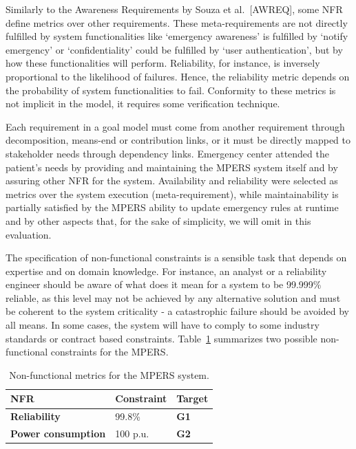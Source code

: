 Similarly to the Awareness Requirements by Souza et al.~[AWREQ], some NFR define metrics over other requirements. These meta-requirements are not directly fulfilled by system functionalities like `emergency awareness' is fulfilled by `notify emergency' or `confidentiality' could be fulfilled by `user authentication', but by how these functionalities will perform. Reliability, for instance, is inversely proportional to the likelihood of failures. Hence, the reliability metric depends on the probability of system functionalities to fail. Conformity to these metrics is not implicit in the model, it requires some verification technique.



Each requirement in a goal model must come from another requirement through decomposition, means-end or contribution links, or it must be directly mapped to stakeholder needs through dependency links. Emergency center attended the patient's needs by providing and maintaining the MPERS system itself and by assuring other NFR for the system. Availability and reliability were selected as metrics over the system execution (meta-requirement), while maintainability is partially satisfied by the MPERS ability to update emergency rules at runtime and by other aspects that, for the sake of simplicity, we will omit in this evaluation.

The specification of non-functional constraints is a sensible task that depends on expertise and on domain knowledge. For instance, an analyst or a reliability engineer should be aware of what does it mean for a system to be 99.999\% reliable, as this level may not be achieved by any alternative solution and must be coherent to the system criticality - a catastrophic failure should be avoided by all means. In some cases, the system will have to comply to some industry standards or contract based constraints. Table~\ref{tab:MPERS_NFR} summarizes two possible non-functional constraints for the MPERS.
\medskip

\begin{table}[h]
{\renewcommand{\arraystretch}{1.5}
\begin{tabularx}{\textwidth}{@{}XXX@{}}
\toprule
\textbf{NFR}               & \textbf{Constraint} & \textbf{Target}        \\ \midrule
\textbf{Reliability}       & 99.8\%            & \textbf{G1} \\
\textbf{Power consumption} & 100 p.u.            & \textbf{G2}          \\ \bottomrule
\end{tabularx}
}
\caption{Non-functional metrics for the MPERS system.}
\label{tab:MPERS_NFR}
\end{table}

